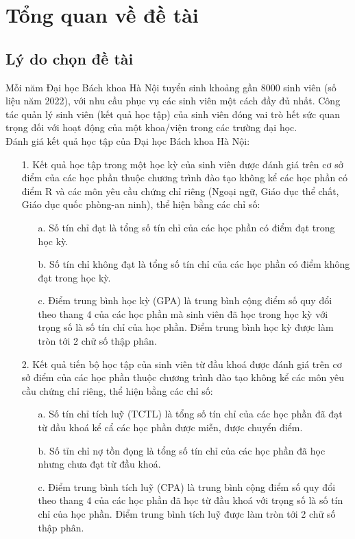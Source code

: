 \chapter{Tổng quan về đề tài}
  \section{Lý do chọn đề tài}
  Mỗi năm Đại học Bách khoa Hà Nội tuyển sinh khoảng gần 8000 sinh viên (số liệu năm 2022), với nhu cầu phục vụ các sinh viên một cách đầy đủ nhất. 
  Công tác quản lý sinh viên (kết quả học tập) của sinh viên đóng vai trò hết sức quan trọng đối với hoạt động của một khoa/viện trong các trường đại học. \\
  
  Đánh giá kết quả học tập của Đại học Bách khoa Hà Nội:
  \begin{itemize}
    \item[1.] Kết quả học tập trong một học kỳ của sinh viên được đánh giá trên cơ sở điểm của các học phần thuộc chương trình đào tạo không kể các học phần có điểm R và các môn yêu cầu chứng chỉ riêng (Ngoại ngữ, Giáo dục thể chất, Giáo dục quốc phòng-an ninh), thể hiện bằng các chỉ số:
      \begin{itemize}
        \item[a.] Số tín chỉ đạt là tổng số tín chỉ của các học phần có điểm đạt trong học kỳ.
        \item[b.] Số tín chỉ không đạt là tổng số tín chỉ của các học phần có điểm không đạt trong học kỳ.
        \item[c.] Điểm trung bình học kỳ (GPA) là trung bình cộng điểm số quy đổi theo thang 4 của các học phần mà sinh viên đã học trong học kỳ với trọng số là số tín chỉ của học phần. Điểm trung bình học kỳ được làm tròn tới 2 chữ số thập phân.  
      \end{itemize}
    \item[2.] Kết quả tiến bộ học tập của sinh viên từ đầu khoá được đánh giá trên cơ sở điểm của các học phần thuộc chương trình đào tạo không kể các môn yêu cầu chứng chỉ riêng, thể hiện bằng các chỉ số:
      \begin{itemize}
        \item[a.] Số tín chỉ tích luỹ (TCTL) là tổng số tín chỉ của các học phần đã đạt từ đầu khoá kể cẩ các học phần được miễn, được chuyển điểm.
        \item[b.] Số tỉn chỉ nợ tồn đọng là tổng số tín chỉ của các học phần đã học nhưng chưa đạt từ đầu khoá.
        \item[c.] Điểm trung bình tích luỹ (CPA) là trung bình cộng điểm số quy đổi theo thang 4 của các học phần đã học từ đầu khoá với trọng số là số tín chỉ của học phần. Điểm trung bình tích luỹ được làm tròn tới 2 chữ số thập phân.

\end{itemize}
\end{itemize}
